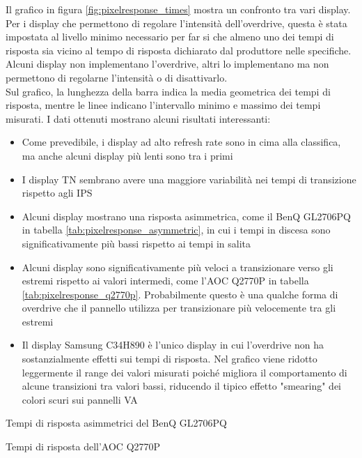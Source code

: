 Il grafico in figura \ref{fig:pixelresponse_times} mostra un confronto tra vari display. Per i display che permettono di regolare l'intensità dell'overdrive, questa è stata impostata al livello minimo necessario per far si che almeno uno dei tempi di risposta sia vicino al tempo di risposta dichiarato dal produttore nelle specifiche. Alcuni display non implementano l'overdrive, altri lo implementano ma non permettono di regolarne l'intensità o di disattivarlo.\\
Sul grafico, la lunghezza della barra indica la media geometrica dei tempi di risposta, mentre le linee indicano l'intervallo minimo e massimo dei tempi misurati. I dati ottenuti mostrano alcuni risultati interessanti:\begin{itemize}
	\item Come prevedibile, i display ad alto refresh rate sono in cima alla classifica, ma anche alcuni display più lenti sono tra i primi
	\item I display TN sembrano avere una maggiore variabilità nei tempi di transizione rispetto agli IPS
	\item Alcuni display mostrano una risposta asimmetrica, come il BenQ GL2706PQ in tabella \ref{tab:pixelresponse_asymmetric}, in cui i tempi in discesa sono significativamente più bassi rispetto ai tempi in salita
	\item Alcuni display sono significativamente più veloci a transizionare verso gli estremi rispetto ai valori intermedi, come l'AOC Q2770P in tabella \ref{tab:pixelresponse_q2770p}. Probabilmente questo è una qualche forma di overdrive che il pannello utilizza per transizionare più velocemente tra gli estremi
	\item Il display Samsung C34H890 è l'unico display in cui l'overdrive non ha sostanzialmente effetti sui tempi di risposta. Nel grafico viene ridotto leggermente il range dei valori misurati poiché migliora il comportamento di alcune transizioni tra valori bassi, riducendo il tipico effetto "smearing" dei colori scuri sui pannelli VA
\end{itemize}

\begin{table}[h!]
	\centering
	\caption{\label{tab:pixelresponse_asymmetric}Tempi di risposta asimmetrici del BenQ GL2706PQ}
\end{table}

\begin{table}[h!]
	\centering
	\caption{\label{tab:pixelresponse_q2770p}Tempi di risposta dell'AOC Q2770P}
\end{table}

